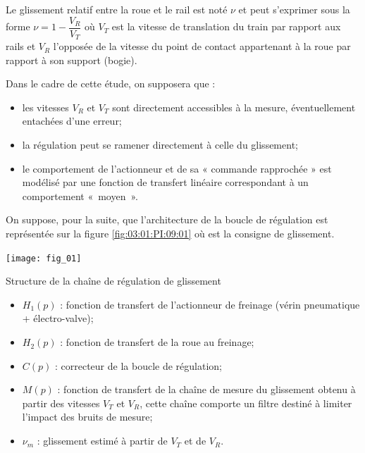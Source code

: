 Le glissement relatif entre la roue et le rail est noté $\nu$ et peut s'exprimer sous la forme $\nu=1-\dfrac{V_R}{V_T}$ où $V_T$ est la vitesse de translation du train par rapport aux rails et $V_R$ l'opposée de la vitesse du point de contact appartenant à la roue par rapport à son support (bogie).
%

Dans le cadre de cette étude, on supposera que :
\begin{itemize}
\item les vitesses $V_R$ et $V_T$ sont directement accessibles à la mesure, éventuellement
entachées d’une erreur;
\item la régulation peut se ramener directement à celle du glissement;
\item  le comportement de l’actionneur et de sa « commande rapprochée » est modélisé
par une fonction de transfert linéaire correspondant à un comportement
«~moyen~».
\end{itemize}
On suppose, pour la suite, que l’architecture de la boucle de régulation est représentée sur la figure \ref{fig:03:01:PI:09:01} où est la consigne de glissement.

\begin{marginfigure}
\texttt{[image: fig\_01]}
\caption{\label{fig:03:01:PI:09:01} Structure de la chaîne de régulation de glissement}%
\end{marginfigure}


\begin{itemize}
\item $H_1(p)$ : fonction de transfert de l’actionneur de freinage (vérin pneumatique
+ électro-valve);
\item $H_2(p)$ : fonction de transfert de la roue au freinage;
\item $C(p)$ : correcteur de la boucle de régulation;
\item $M(p)$ : fonction de transfert de la chaîne de mesure du glissement obtenu à
partir des vitesses $V_T$ et $V_R$, cette chaîne comporte un filtre destiné à limiter
l’impact des bruits de mesure;
\item $\nu_m$ : glissement estimé à partir de $V_T$ et de $V_R$.
\end{itemize}

